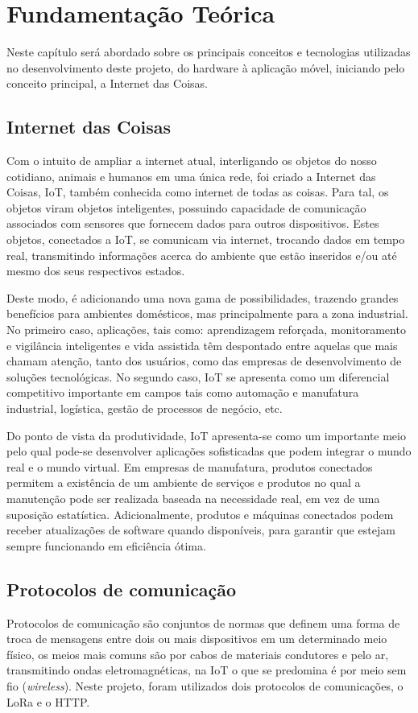 \chapter{Fundamentação Teórica}
\label{cap:fundamentacao}
Neste capítulo será abordado sobre os principais conceitos e tecnologias utilizadas no desenvolvimento deste projeto, do hardware à aplicação móvel, iniciando pelo conceito principal, a Internet das Coisas.

\section{Internet das Coisas}
\label{fund:iot}
Com o intuito de ampliar a internet atual, interligando os objetos do nosso cotidiano, animais e humanos em uma única rede, foi criado a Internet das Coisas, IoT, também conhecida como internet de todas as coisas. Para tal, os objetos viram objetos inteligentes, possuindo capacidade de comunicação associados com sensores que fornecem dados para outros dispositivos. Estes objetos, conectados a IoT, se comunicam via internet, trocando dados em tempo real, transmitindo informações acerca do ambiente que estão inseridos e/ou até mesmo dos seus respectivos estados. 

Deste modo, é adicionando uma nova gama de possibilidades, trazendo grandes benefícios para ambientes domésticos, mas principalmente para a zona industrial. No primeiro caso, aplicações, tais como: aprendizagem reforçada, monitoramento e vigilância inteligentes e vida assistida têm despontado entre aquelas que mais chamam atenção, tanto dos usuários, como das empresas de desenvolvimento de soluções tecnológicas. No segundo caso, IoT se apresenta como um diferencial competitivo importante em campos tais como automação e manufatura industrial, logística, gestão de processos de negócio, etc.

Do ponto de vista da produtividade, IoT apresenta-se como um importante meio pelo qual pode-se desenvolver aplicações sofisticadas que podem integrar o mundo real e o mundo virtual. Em empresas de manufatura, produtos conectados permitem a existência de um ambiente de serviços e produtos no qual a manutenção pode ser realizada baseada na necessidade real, em vez de uma suposição estatística. Adicionalmente, produtos e máquinas conectados podem receber atualizações de software quando disponíveis, para garantir que estejam sempre funcionando em eficiência ótima.

\section{Protocolos de comunicação}
\label{fund:protocolos}
Protocolos de comunicação são conjuntos de normas que definem uma forma de troca de mensagens entre dois ou mais dispositivos em um determinado meio físico, os meios mais comuns são por cabos de materiais condutores e pelo ar, transmitindo ondas eletromagnéticas, na IoT o que se predomina é por meio sem fio (\textit{wireless}). Neste projeto, foram utilizados dois protocolos de comunicações, o LoRa e o HTTP.

